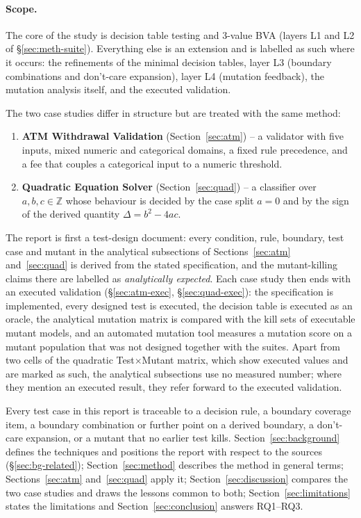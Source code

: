\documentclass[11pt,a4paper]{article}
\begin{document}
\paragraph{Scope.} The core of the study is decision table testing and
3-value BVA (layers L1 and L2 of \S\ref{sec:meth-suite}). Everything else is
an extension and is labelled as such where it occurs: the refinements of the
minimal decision tables, layer L3 (boundary combinations and don't-care
expansion), layer L4 (mutation feedback), the mutation analysis itself, and
the executed validation.

The two case studies differ in structure but are treated with the same
method:
\begin{enumerate}[label=(\arabic*)]
    \item \textbf{ATM Withdrawal Validation}
    (Section~\ref{sec:atm}) -- a validator with five inputs, mixed numeric
    and categorical domains, a fixed rule precedence, and a fee that couples
    a categorical input to a numeric threshold.
    \item \textbf{Quadratic Equation Solver} (Section~\ref{sec:quad}) -- a
    classifier over \(a,b,c\in\mathbb{Z}\) whose behaviour is decided by the
    case split \(a=0\) and by the sign of the derived quantity
    \(\Delta=b^2-4ac\).
\end{enumerate}

The report is first a test-design document: every condition, rule,
boundary, test case and mutant in the analytical subsections of
Sections~\ref{sec:atm} and~\ref{sec:quad} is derived from the stated
specification, and the mutant-killing claims there are labelled as
\emph{analytically expected}. Each case study then ends with an executed
validation (\S\ref{sec:atm-exec}, \S\ref{sec:quad-exec}): the
specification is implemented, every designed test is executed, the decision
table is executed as an oracle, the analytical mutation matrix is compared
with the kill sets of executable mutant models, and an automated mutation
tool measures a mutation score on a mutant population that was not designed
together with the suites. Apart from two cells of the quadratic Test\(\times\)Mutant matrix, which show executed values and are marked as such, the analytical subsections use no measured number; where they mention an executed result, they refer forward to the executed validation.

Every test case in this report is traceable to a decision rule, a boundary
coverage item, a boundary combination or further point on a derived
boundary, a don't-care expansion, or a mutant that no earlier test kills.
Section~\ref{sec:background} defines the techniques and positions the
report with respect to the sources (\S\ref{sec:bg-related});
Section~\ref{sec:method} describes the method in general terms;
Sections~\ref{sec:atm} and~\ref{sec:quad} apply it;
Section~\ref{sec:discussion} compares the two case studies and draws the
lessons common to both; Section~\ref{sec:limitations} states the
limitations and Section~\ref{sec:conclusion} answers RQ1--RQ3.
\end{document}
